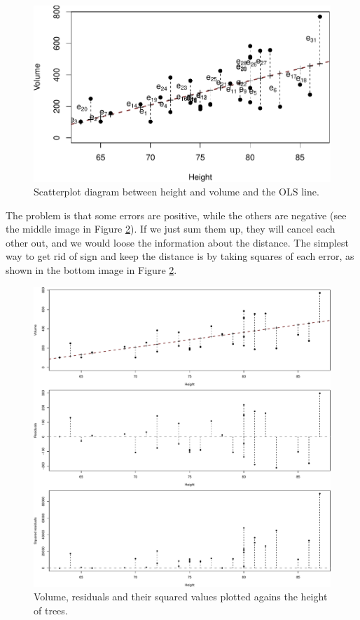\documentclass[
]{book}
\theoremstyle{definition}
\theoremstyle{definition}
\theoremstyle{definition}
\theoremstyle{definition}
\theoremstyle{remark}
\begin{document}
\begin{figure}
\centering
\includegraphics{Svetunkov---Statistics-for-Business-Analytics_files/figure-latex/TreesModelOLS-1.pdf}
\caption{\label{fig:TreesModelOLS}Scatterplot diagram between height and volume and the OLS line.}
\end{figure}

The problem is that some errors are positive, while the others are negative (see the middle image in Figure \ref{fig:TreesModelOLSResid}). If we just sum them up, they will cancel each other out, and we would loose the information about the distance. The simplest way to get rid of sign and keep the distance is by taking squares of each error, as shown in the bottom image in Figure \ref{fig:TreesModelOLSResid}.

\begin{figure}
\centering
\includegraphics{Svetunkov---Statistics-for-Business-Analytics_files/figure-latex/TreesModelOLSResid-1.pdf}
\caption{\label{fig:TreesModelOLSResid}Volume, residuals and their squared values plotted agains the height of trees.}
\end{figure}
\end{document}
